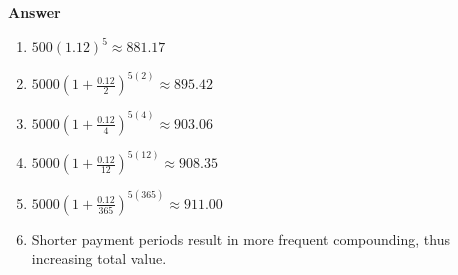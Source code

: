 \documentclass[11pt]{article}
\begin{document}
\bigskip
\textbf{Answer}

\begin{enumerate}
  \item[a.] $500(1.12)^5 \approx 881.17$
  \item[b.] $5000(1 + \frac {0.12}{2})^{5(2)} \approx 895.42$ 
  \item[c.] $5000(1 + \frac {0.12}{4})^{5(4)} \approx 903.06$ 
  \item[d.] $5000(1 + \frac {0.12}{12})^{5(12)} \approx 908.35$ 
  \item[e.] $5000(1 + \frac {0.12}{365})^{5(365)} \approx 911.00$ 
  \item[f.] Shorter payment periods result in more frequent compounding, thus increasing total value. 
\end{enumerate}
\end{document}
